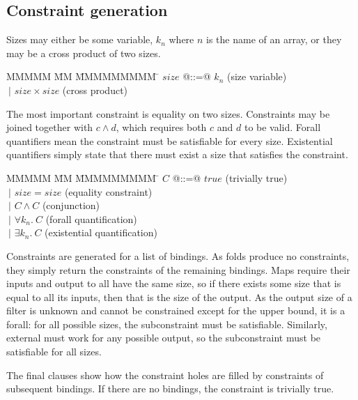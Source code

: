 \newcommand{\constr}[1]{\llbracket #1 \rrbracket}


\subsection{Constraint generation}
Sizes may either be some variable, $k_n$ where $n$ is the name of an array, or they may be a cross product of two sizes.
\begin{tabbing}
MMMMM   \= MM \= MMMMMMMMM \= \kill
$size$  \> @::=@ \> $k_n$               \> (size variable) \\
        \> $~|$  \> $size \times size$  \> (cross product)
\end{tabbing}

The most important constraint is equality on two sizes.
Constraints may be joined together with $c \wedge d$, which requires both $c$ and $d$ to be valid.
Forall quantifiers mean the constraint must be satisfiable for every size.
Existential quantifiers simply state that there must exist a size that satisfies the constraint.
\begin{tabbing}
MMMMM   \= MM \= MMMMMMMMM \= \kill
$C$     \> @::=@ \> $true$              \> (trivially true)             \\
        \> $~|$  \> $size = size$       \> (equality constraint)        \\
        \> $~|$  \> $C \wedge C$        \> (conjunction)                \\
        \> $~|$  \> $\forall k_n.\ C$   \> (forall quantification)      \\
        \> $~|$  \> $\exists k_n.\ C$   \> (existential quantification)
\end{tabbing}

Constraints are generated for a list of bindings.
As folds produce no constraints, they simply return the constraints of the remaining bindings.
Maps require their inputs and output to all have the same size, so if there exists some size that is equal to all its inputs, then that is the size of the output.
As the output size of a filter is unknown and cannot be constrained except for the upper bound, it is a forall: for all possible sizes, the subconstraint must be satisfiable.
Similarly, external must work for any possible output, so the subconstraint must be satisfiable for all sizes.

The final clauses show how the constraint holes are filled by constraints of subsequent bindings. If there are no bindings, the constraint is trivially true.

